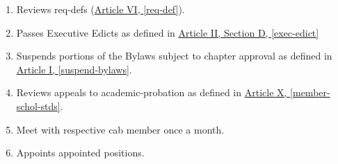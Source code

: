 \begin{enumerate}
\begin{enumerate}
\begin{enumerate}
					\item The Acceptable Excuses Plan shall be distributed to the chapter one week before retreat at the beginning of every semester and approved at retreat, with any necessary amendments, as a piece of temporary legislation valid for one semester.
				\end{enumerate}
				\item Reviews \glspl{req-def} (\hyperref[req-def]{Article VI, \autoref*{req-def}}).
				\item Passes Executive Edicts as defined in \hyperref[exec-edict]{Article II, Section D, \autoref*{exec-edict}}
				\item Suspends portions of the Bylaws subject to chapter approval as defined in \hyperref[suspend-bylaws]{Article I, \autoref*{suspend-bylaws}}.
				\item Reviews appeals to \gls{academic-probation} as defined in \hyperref[schol-appeals]{Article X, \autoref*{member-schol-stds}}.
				\item Meet with respective \gls{cab} member once a month.
				\item Appoints appointed positions.
			\end{enumerate}


\end{enumerate}
